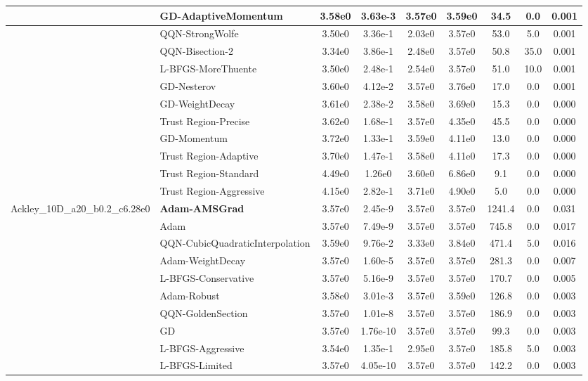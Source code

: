 \documentclass[10pt]{article}
\begin{document}
\begin{longtable}{|l|l|c|c|c|c|c|c|c|}
 & GD-AdaptiveMomentum & 3.58e0 & 3.63e-3 & 3.57e0 & 3.59e0 & 34.5 & 0.0 & 0.001 \\
\hline
 & QQN-StrongWolfe & 3.50e0 & 3.36e-1 & 2.03e0 & 3.57e0 & 53.0 & 5.0 & 0.001 \\
\hline
 & QQN-Bisection-2 & 3.34e0 & 3.86e-1 & 2.48e0 & 3.57e0 & 50.8 & 35.0 & 0.001 \\
\hline
 & L-BFGS-MoreThuente & 3.50e0 & 2.48e-1 & 2.54e0 & 3.57e0 & 51.0 & 10.0 & 0.001 \\
\hline
 & GD-Nesterov & 3.60e0 & 4.12e-2 & 3.57e0 & 3.76e0 & 17.0 & 0.0 & 0.001 \\
\hline
 & GD-WeightDecay & 3.61e0 & 2.38e-2 & 3.58e0 & 3.69e0 & 15.3 & 0.0 & 0.000 \\
\hline
 & Trust Region-Precise & 3.62e0 & 1.68e-1 & 3.57e0 & 4.35e0 & 45.5 & 0.0 & 0.000 \\
\hline
 & GD-Momentum & 3.72e0 & 1.33e-1 & 3.59e0 & 4.11e0 & 13.0 & 0.0 & 0.000 \\
\hline
 & Trust Region-Adaptive & 3.70e0 & 1.47e-1 & 3.58e0 & 4.11e0 & 17.3 & 0.0 & 0.000 \\
\hline
 & Trust Region-Standard & 4.49e0 & 1.26e0 & 3.60e0 & 6.86e0 & 9.1 & 0.0 & 0.000 \\
\hline
 & Trust Region-Aggressive & 4.15e0 & 2.82e-1 & 3.71e0 & 4.90e0 & 5.0 & 0.0 & 0.000 \\
Ackley\_10D\_a20\_b0.2\_c6.28e0 & \textbf{Adam-AMSGrad} & 3.57e0 & 2.45e-9 & 3.57e0 & 3.57e0 & 1241.4 & 0.0 & 0.031 \\
\hline
 & Adam & 3.57e0 & 7.49e-9 & 3.57e0 & 3.57e0 & 745.8 & 0.0 & 0.017 \\
\hline
 & QQN-CubicQuadraticInterpolation & 3.59e0 & 9.76e-2 & 3.33e0 & 3.84e0 & 471.4 & 5.0 & 0.016 \\
\hline
 & Adam-WeightDecay & 3.57e0 & 1.60e-5 & 3.57e0 & 3.57e0 & 281.3 & 0.0 & 0.007 \\
\hline
 & L-BFGS-Conservative & 3.57e0 & 5.16e-9 & 3.57e0 & 3.57e0 & 170.7 & 0.0 & 0.005 \\
\hline
 & Adam-Robust & 3.58e0 & 3.01e-3 & 3.57e0 & 3.59e0 & 126.8 & 0.0 & 0.003 \\
\hline
 & QQN-GoldenSection & 3.57e0 & 1.01e-8 & 3.57e0 & 3.57e0 & 186.9 & 0.0 & 0.003 \\
\hline
 & GD & 3.57e0 & 1.76e-10 & 3.57e0 & 3.57e0 & 99.3 & 0.0 & 0.003 \\
\hline
 & L-BFGS-Aggressive & 3.54e0 & 1.35e-1 & 2.95e0 & 3.57e0 & 185.8 & 5.0 & 0.003 \\
\hline
 & L-BFGS-Limited & 3.57e0 & 4.05e-10 & 3.57e0 & 3.57e0 & 142.2 & 0.0 & 0.003 \\

\end{longtable}
\end{document}
